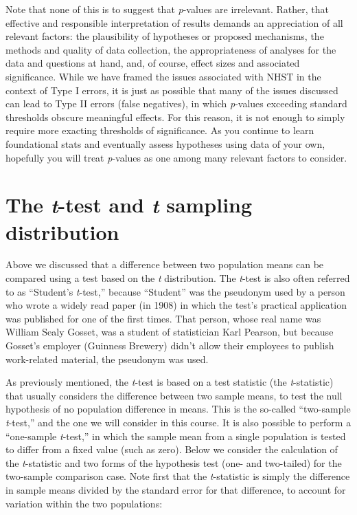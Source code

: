 \documentclass[]{book}
\begin{document}
Note that none of this is to suggest that \emph{p}-values are irrelevant. Rather, that effective and responsible interpretation of results demands an appreciation of all relevant factors: the plausibility of hypotheses or proposed mechanisms, the methods and quality of data collection, the appropriateness of analyses for the data and questions at hand, and, of course, effect sizes and associated significance. While we have framed the issues associated with NHST in the context of Type I errors, it is just as possible that many of the issues discussed can lead to Type II errors (false negatives), in which \emph{p}-values exceeding standard thresholds obscure meaningful effects. For this reason, it is not enough to simply require more exacting thresholds of significance. As you continue to learn foundational stats and eventually assess hypotheses using data of your own, hopefully you will treat \emph{p}-values as one among many relevant factors to consider.

\hypertarget{the-t-test-and-t-sampling-distribution}{%
\section{\texorpdfstring{The \emph{t}-test and \emph{t} sampling distribution}{The t-test and t sampling distribution}}\label{the-t-test-and-t-sampling-distribution}}

Above we discussed that a difference between two population means can be compared using a test based on the \emph{t} distribution. The \emph{t}-test is also often referred to as ``Student's \emph{t}-test,'' because ``Student'' was the pseudonym used by a person who wrote a widely read paper (in 1908) in which the test's practical application was published for one of the first times. That person, whose real name was William Sealy Gosset, was a student of statistician Karl Pearson, but because Gosset's employer (Guinness Brewery) didn't allow their employees to publish work-related material, the pseudonym was used.

As previously mentioned, the \emph{t}-test is based on a test statistic (the \emph{t}-statistic) that usually considers the difference between two sample means, to test the null hypothesis of no population difference in means. This is the so-called ``two-sample \emph{t}-test,'' and the one we will consider in this course. It is also possible to perform a ``one-sample \emph{t}-test,'' in which the sample mean from a single population is tested to differ from a fixed value (such as zero). Below we consider the calculation of the \emph{t}-statistic and two forms of the hypothesis test (one- and two-tailed) for the two-sample comparison case. Note first that the \emph{t}-statistic is simply the difference in sample means divided by the standard error for that difference, to account for variation within the two populations:
\end{document}
